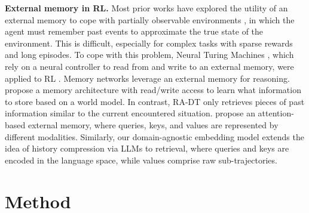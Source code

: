 \documentclass{article}
\begin{document}
\textbf{External memory in RL.}
Most prior works have explored the utility of an external memory to cope with partially observable environments \citep{Astrom:1965,Kaelbling:1998}, in which the agent must remember past events to approximate the true state of the environment.
This is difficult, especially for complex tasks with sparse rewards \citep{Medina:2019,Patil:22,Widrich:21} and long episodes.
To cope with this problem, Neural Turing Machines \citep{Graves:2014}, which rely on a neural controller to read from and write to an external memory, were applied to RL \citep{Zaremba:2015}.
Memory networks \citep{Weston:2015} leverage an external memory for reasoning.
\citet{Wayne:2018} propose a memory architecture with read/write access to learn what information to store based on a world model.
In contrast, RA-DT only retrieves pieces of past information similar to the current encountered situation.
\citet{Hill:2021} propose an attention-based external memory, where queries, keys, and values are represented by different modalities.
Similarly, our domain-agnostic embedding model extends the idea of history compression via LLMs \citep{Paischer:22,Paischer:23} to retrieval, where queries and keys are encoded in the language space, while values comprise raw sub-trajectories.
\section{Method}\label{sec:method}
\end{document}
